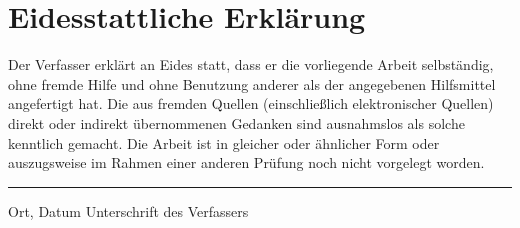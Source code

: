 %
%
\thispagestyle{empty}
%
\chapter*{Eidesstattliche Erklärung}
%
Der Verfasser erklärt an Eides statt, 
dass er die vorliegende Arbeit selbständig, 
ohne fremde Hilfe und ohne Benutzung anderer als der angegebenen 
Hilfsmittel angefertigt hat. 
Die aus fremden Quellen (einschließlich elektronischer Quellen) direkt 
oder indirekt übernommenen Gedanken sind ausnahmslos als solche kenntlich gemacht. 
Die Arbeit ist in gleicher oder ähnlicher Form oder auszugsweise im 
Rahmen einer anderen Prüfung noch nicht vorgelegt worden.
\vspace{2.0cm}
%
\hrule
Ort, Datum  \hspace*{.55\textwidth} Unterschrift des Verfassers 
%
